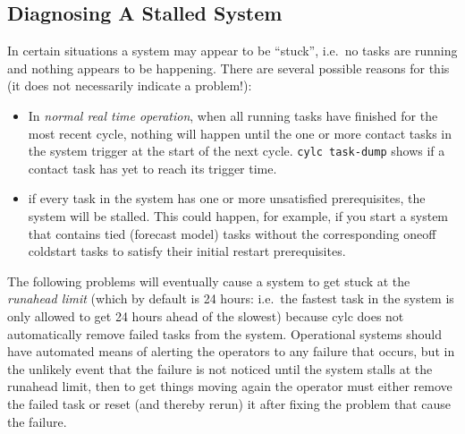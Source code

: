 \documentclass[11pt,a4paper]{article}
\begin{document}
\subsection{Diagnosing A Stalled System}
\label{DiagnosingAStalledSystem}

In certain situations a system may appear to be ``stuck'', i.e.\ no
tasks are running and nothing appears to be happening. There are several 
possible reasons for this (it does not necessarily indicate a problem!):

\begin{itemize}
    \item In {\em normal real time operation}, when all running tasks
        have finished for the most recent cycle, nothing will happen
        until the one or more contact tasks in the system trigger at the
        start of the next cycle. \lstinline=cylc task-dump= shows if a
        contact task has yet to reach its trigger time.

    \item if every task in the system has one or more unsatisfied
        prerequisites, the system will be stalled. This could happen,
        for example, if you start a system that contains tied (forecast
        model) tasks without the corresponding oneoff coldstart tasks to
        satisfy their initial restart prerequisites.

\end{itemize}

The following problems will eventually cause a system to get stuck at
the {\em runahead limit} (which by default is 24 hours: i.e.\ the
fastest task in the system is only allowed to get 24 hours ahead of the
slowest) because cylc does not automatically remove failed tasks from
the system.  Operational systems should have automated means of
alerting the operators to any failure that occurs, but in the
unlikely event that the failure is not noticed until the system stalls
at the runahead limit, then to get things moving again the operator must
either remove the failed task or reset (and thereby rerun) it after
fixing the problem that cause the failure.
\end{document}
